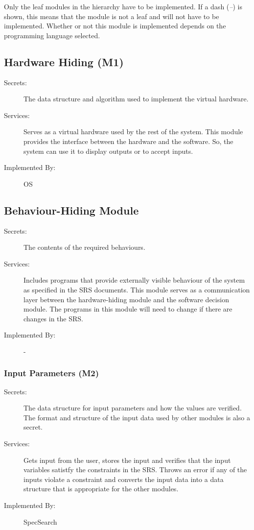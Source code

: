 \documentclass[12pt, titlepage]{article}
\begin{document}
Only the leaf modules in the
hierarchy have to be implemented. If a dash (\emph{--}) is shown, this means
that the module is not a leaf and will not have to be implemented. Whether or
not this module is implemented depends on the programming language
selected.

\subsection{Hardware Hiding (M1)}

\begin{description}
\item[Secrets:]The data structure and algorithm used to implement the virtual
  hardware.
\item[Services:]Serves as a virtual hardware used by the rest of the
  system. This module provides the interface between the hardware and the
  software. So, the system can use it to display outputs or to accept inputs.
\item[Implemented By:] OS
\end{description}

\subsection{Behaviour-Hiding Module }

\begin{description}
\item[Secrets:]The contents of the required behaviours.
\item[Services:]Includes programs that provide externally visible behaviour of
  the system as specified in the SRS
  documents. This module serves as a communication layer between the
  hardware-hiding module and the software decision module. The programs in this
  module will need to change if there are changes in the SRS.
\item[Implemented By:] -
\end{description}

\subsubsection{Input Parameters (M2)}

\begin{description}
	\item[Secrets:] The data structure for input parameters and how the values 
	are verified. The format and structure of the 
	input data used by other modules is also a secret.
	\item[Services:] Gets input from the user, stores the input and verifies 
	that 
	the input variables satistfy the constraints in the SRS. Throws an error if 
	any of 
	the inputs violate a constraint and converts the input data into a data 
	structure that is 
	appropriate for the other 
	modules. 
	\item[Implemented By:]SpecSearch 
\end{description} 
\end{document}
